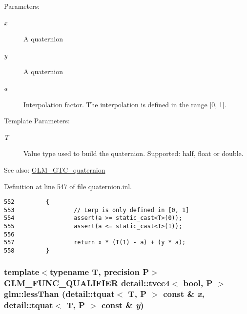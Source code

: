 \begin{Desc}
\item[Parameters:]
\begin{description}
\item[{\em x}]A quaternion \item[{\em y}]A quaternion \item[{\em a}]Interpolation factor. The interpolation is defined in the range \mbox{[}0, 1\mbox{]}. \end{description}
\end{Desc}
\begin{Desc}
\item[Template Parameters:]
\begin{description}
\item[{\em T}]Value type used to build the quaternion. Supported: half, float or double. \end{description}
\end{Desc}
\begin{Desc}
\item[See also:]\hyperlink{group__gtc__quaternion}{GLM\_\-GTC\_\-quaternion} \end{Desc}


Definition at line 547 of file quaternion.inl.

\begin{Code}\begin{verbatim}552         {
553                 // Lerp is only defined in [0, 1]
554                 assert(a >= static_cast<T>(0));
555                 assert(a <= static_cast<T>(1));
556 
557                 return x * (T(1) - a) + (y * a);
558         }
\end{verbatim}
\end{Code}


\hypertarget{group__gtc__quaternion_gf0ab4cfbc0f3e16f060fa4dd501b5dc1}{
\subsubsection[lessThan]{\setlength{\rightskip}{0pt plus 5cm}template$<$typename T, precision P$>$ GLM\_\-FUNC\_\-QUALIFIER detail::tvec4$<$ bool, P $>$ glm::lessThan (detail::tquat$<$ T, P $>$ const \& {\em x}, \/  detail::tquat$<$ T, P $>$ const \& {\em y})}}
\label{group__gtc__quaternion_gf0ab4cfbc0f3e16f060fa4dd501b5dc1}


